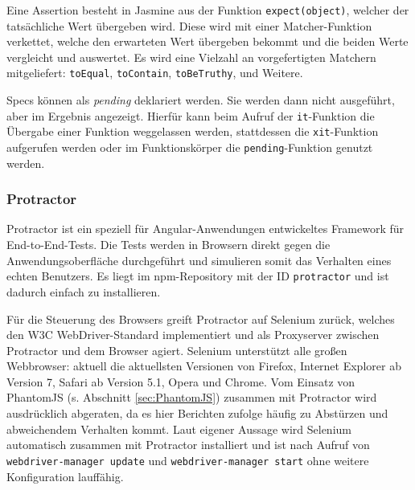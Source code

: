 Eine Assertion besteht in Jasmine aus der Funktion \texttt{expect(object)}, welcher der tatsächliche Wert übergeben wird. Diese wird mit einer Matcher-Funktion verkettet, welche den erwarteten Wert übergeben bekommt und die beiden Werte vergleicht und auswertet. Es wird eine Vielzahl an vorgefertigten Matchern mitgeliefert: \texttt{toEqual}, \texttt{toContain}, \texttt{toBeTruthy}, und Weitere\cite{jasmine-introduction, jasmine-cheatsheet}.

\begin{figure}[H]
	
\end{figure}

Specs können als \textit{pending} deklariert werden. Sie werden dann nicht ausgeführt, aber im Ergebnis angezeigt. Hierfür kann beim Aufruf der \texttt{it}-Funktion die Übergabe einer Funktion weggelassen werden, stattdessen die \texttt{xit}-Funktion aufgerufen werden oder im Funktionskörper die \texttt{pending}-Funktion genutzt werden.\cite{jasmine-introduction}

\subsubsection{Protractor}
\label{sec:Protractor}
Protractor ist ein speziell für Angular-Anwendungen entwickeltes Framework für End-to-End-Tests. Die Tests werden in Browsern direkt gegen die Anwendungsoberfläche durchgeführt und simulieren somit das Verhalten eines echten Benutzers. Es liegt im npm-Repository mit der ID \texttt{protractor} und ist dadurch einfach zu installieren.\cite{protractor-index}

Für die Steuerung des Browsers greift Protractor auf Selenium zurück\cite{protractor-index}, welches den W3C WebDriver-Standard implementiert und als Proxyserver zwischen Protractor und dem Browser agiert\cite{selenium}. Selenium unterstützt alle großen Webbrowser: aktuell die aktuellsten Versionen von Firefox, Internet Explorer ab Version 7, Safari ab Version 5.1, Opera und Chrome\cite{selenium-browsers}. Vom Einsatz von PhantomJS (s. Abschnitt \ref{sec:PhantomJS}) zusammen mit Protractor wird ausdrücklich abgeraten, da es hier Berichten zufolge häufig zu Abstürzen und abweichendem Verhalten kommt\cite{protractor-browser}. Laut eigener Aussage wird Selenium automatisch zusammen mit Protractor installiert und ist nach Aufruf von \texttt{webdriver-manager update} und \texttt{webdriver-manager start} ohne weitere Konfiguration lauffähig\cite{protractor-index}.

